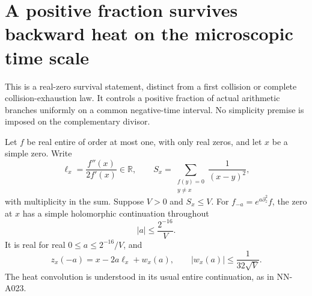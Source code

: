 \section{A positive fraction survives backward heat on the microscopic time scale}
\label{sec:A050-backward-survival}

This is a real-zero survival statement, distinct from a first
collision or complete collision-exhaustion law. It controls a
positive fraction of actual arithmetic branches uniformly on
a common negative-time interval. No simplicity premise is imposed
on the complementary divisor.

\begin{lemma}
\label{lem:A050-local-survival}
Let \(f\) be real entire of order at most one, with only real
zeros, and let \(x\) be a simple zero. Write
\[
 \ell_x=\frac{f''(x)}{2f'(x)}\in\mathbb R,\qquad
 S_x=\sum_{\substack{f(y)=0\\y\ne x}}\frac1{(x-y)^2},
\]
with multiplicity in the sum. Suppose \(V>0\) and \(S_x\le V\).
For \(f_{-a}=e^{a\partial_z^2}f\), the zero at \(x\) has a
simple holomorphic continuation throughout
\[
                         |a|\le\frac{2^{-16}}V.
\]
It is real for real \(0\le a\le2^{-16}/V\), and
\begin{equation}\label{eq:A050-local-location}
 z_x(-a)=x-2a\ell_x+w_x(a),\qquad
                    |w_x(a)|\le\frac1{32\sqrt V}.
\end{equation}
The heat convolution is understood in its usual entire
continuation, as in NN-A023.
\end{lemma}

